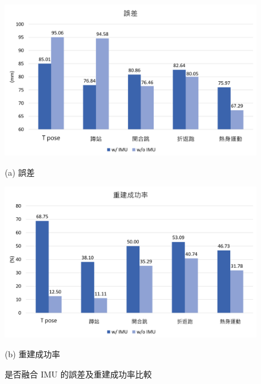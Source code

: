 \begin{figure}[!ht]
   \centering
   \begin{minipage}{\textwidth}
     \centering
     \includegraphics[width=\linewidth]{figure/ch4_fig_error.png}
     \caption*{(a) 誤差}
   \end{minipage}
   \begin{minipage}{\textwidth}
      \centering
      \includegraphics[width=\linewidth]{figure/ch4_fig_success.png}
      \caption*{(b) 重建成功率}
   \end{minipage}
   \caption[是否融合 IMU 的誤差及重建成功率比較]{是否融合 IMU 的誤差及重建成功率比較}
   \label{ch4_fig_error_success}
\end{figure}

\clearpage

